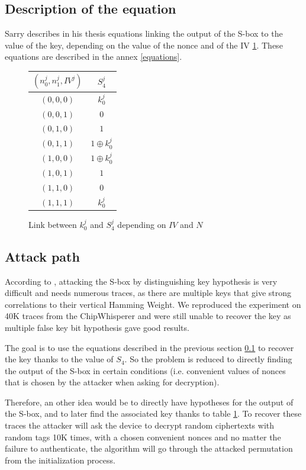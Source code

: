 \documentclass[a4paper,11pt,twocolumn]{article}
\begin{document}
	\subsection{Description of the equation} \label{sec_equ}
	Sarry \cite{these} describes in his thesis equations linking the output of the S-box to the value of the key, depending on the value of the nonce and of the IV \ref{link_k_s4}. These equations are described in the annex \ref{equations}.
	
	\begin{figure}[h]
		\centering
		\begin{tabular}{|c|c|}
			\hline
			$(n_0^j,n_1^j,IV^j)$&$S_4^j$\\
			\hline\hline
			$(0,0,0)$&$k_0^j$\\
			\hline
			$(0,0,1)$&$0$\\
			\hline
			$(0,1,0)$&$1$\\
			\hline
			$(0,1,1)$&$1 \oplus k_0^j$\\
			\hline
			$(1,0,0)$&$1 \oplus k_0^j$\\
			\hline
			$(1,0,1)$&$1$\\
			\hline
			$(1,1,0)$&$0$\\
			\hline
			$(1,1,1)$&$k_0^j$\\
			\hline
		\end{tabular}
		\caption{Link between $k_0^j$ and $S_4^j$ depending on $IV$ and $N$}
		\label{link_k_s4}
	\end{figure}
	
	\subsection{Attack path}
	According to \cite{cpa_analysis}, attacking the S-box by distinguishing key hypothesis is very difficult and needs numerous traces, as there are multiple keys that give strong correlations to their vertical Hamming Weight. We reproduced the experiment on 40K traces from the ChipWhisperer and were still unable to recover the key as multiple false key bit hypothesis gave good results.
	
	The goal is to use the equations described in the previous section \ref{sec_equ} to recover the key thanks to the value of $S_4$. So the problem is reduced to directly finding the output of the S-box in certain conditions (i.e. convenient values of nonces that is chosen by the attacker when asking for decryption). 
	
	Therefore, an other idea would be to directly have hypotheses for the output of the S-box, and to later find the associated key thanks to table \ref{link_k_s4}. To recover these traces the attacker will ask the device to decrypt random ciphertexts with random tags 10K times, with a chosen convenient nonces and no matter the failure to authenticate, the algorithm will go through the attacked permutation from the initialization process.
	
\end{document}

